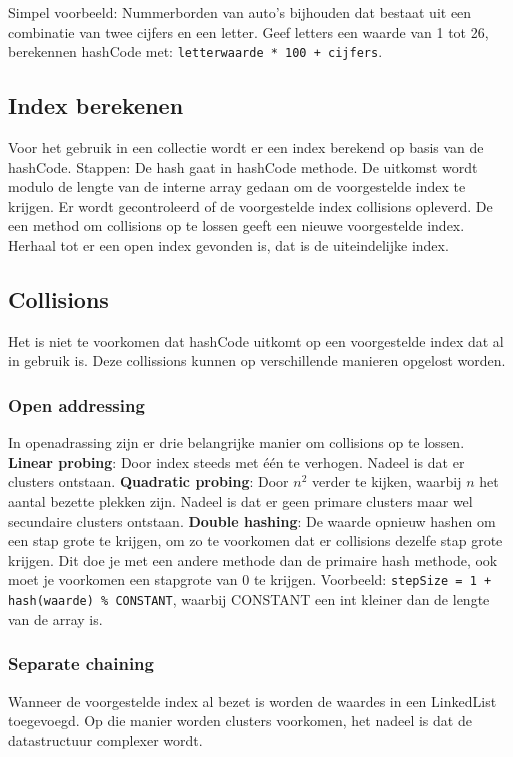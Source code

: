 Simpel voorbeeld:
Nummerborden van auto's bijhouden dat bestaat uit een combinatie van twee cijfers en een letter.
Geef letters een waarde van 1 tot 26, berekennen hashCode met: \texttt{letterwaarde * 100 + cijfers}.

\subsection{Index berekenen}
Voor het gebruik in een collectie wordt er een index berekend op basis van de hashCode.
Stappen:
De hash gaat in hashCode methode.
De uitkomst wordt modulo de lengte van de interne array gedaan om de voorgestelde index te krijgen.
Er wordt gecontroleerd of de voorgestelde index collisions opleverd.
De een method om collisions op te lossen geeft een nieuwe voorgestelde index.
Herhaal tot er een open index gevonden is, dat is de uiteindelijke index.

\subsection{Collisions}
Het is niet te voorkomen dat hashCode uitkomt op een voorgestelde index dat al in gebruik is. 
Deze collissions kunnen op verschillende manieren opgelost worden.

\subsubsection{Open addressing}
In openadrassing zijn er drie belangrijke manier om collisions op te lossen.
\textbf{Linear probing}: Door index steeds met \'e\'en te verhogen.
Nadeel is dat er clusters ontstaan.
\textbf{Quadratic probing}: Door $n^2$ verder te kijken, waarbij $n$ het aantal bezette plekken zijn.
Nadeel is dat er geen primare clusters maar wel secundaire clusters ontstaan.
\textbf{Double hashing}: De waarde opnieuw hashen om een stap grote te krijgen, om zo te voorkomen dat er collisions dezelfe stap grote krijgen.
Dit doe je met een andere methode dan de primaire hash methode, ook moet je voorkomen een stapgrote van 0 te krijgen.
Voorbeeld: \texttt{stepSize = 1 + hash(waarde) \% CONSTANT}, waarbij CONSTANT een int kleiner dan de lengte van de array is.

\subsubsection{Separate chaining}
Wanneer de voorgestelde index al bezet is worden de waardes in een LinkedList toegevoegd.
Op die manier worden clusters voorkomen, het nadeel is dat de datastructuur complexer wordt.
